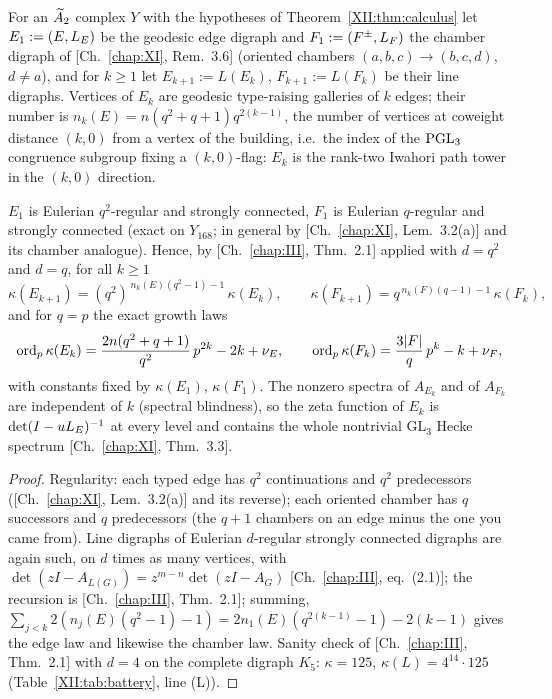 \begin{definition}\label{XII:def:towers}
For an $\widetilde A_2$ complex $Y$ with the hypotheses of Theorem~\ref{XII:thm:calculus} let
$E_1:=(E,L_E)$ be the geodesic edge digraph and $F_1:=(F^{\pm},L_{F})$ the chamber digraph of
[Ch.~\ref{chap:XI}, Rem.~3.6] (oriented chambers $(a,b,c)\to(b,c,d)$, $d\ne a$), and for $k\ge1$ let
$E_{k+1}:=L(E_k)$, $F_{k+1}:=L(F_k)$ be their line digraphs. Vertices of $E_k$ are geodesic
type-raising galleries of $k$ edges; their number is
$n_k(E)=n(q^{2}+q+1)q^{2(k-1)}$, the number of vertices at coweight distance $(k,0)$ from a
vertex of the building, i.e.\ the index of the $\mathrm{PGL}_3$ congruence subgroup fixing a
$(k,0)$-flag: $E_k$ is the rank-two Iwahori path tower in the $(k,0)$ direction.
\end{definition}

\begin{theorem}\label{XII:thm:towers}
$E_1$ is Eulerian $q^{2}$-regular and strongly connected, $F_1$ is Eulerian $q$-regular and
strongly connected (exact on $Y_{168}$; in general by {\rm[Ch.~\ref{chap:XI}, Lem.~3.2(a)]} and its chamber
analogue). Hence, by {\rm[Ch.~\ref{chap:III}, Thm.~2.1]} applied with $d=q^{2}$ and $d=q$, for all $k\ge1$
\[
\kappa(E_{k+1})=(q^{2})^{\,n_k(E)(q^{2}-1)-1}\,\kappa(E_k),\qquad
\kappa(F_{k+1})=q^{\,n_k(F)(q-1)-1}\,\kappa(F_k),
\]
and for $q=p$ the exact growth laws
\[
\operatorname{ord}_p\kappa(E_k)=\frac{2n(q^{2}+q+1)}{q^{2}}\,p^{2k}-2k+\nu_E,\qquad
\operatorname{ord}_p\kappa(F_k)=\frac{3|F|}{q}\,p^{k}-k+\nu_F ,
\]
with constants fixed by $\kappa(E_1)$, $\kappa(F_1)$. The nonzero spectra of $A_{E_k}$ and of
$A_{F_k}$ are independent of $k$ (spectral blindness), so the zeta function of $E_k$ is
$\det(I-uL_E)^{-1}$ at every level and contains the whole nontrivial $\mathrm{GL}_3$ Hecke
spectrum {\rm[Ch.~\ref{chap:XI}, Thm.~3.3]}.
\end{theorem}

\begin{proof}
Regularity: each typed edge has $q^{2}$ continuations and $q^{2}$ predecessors
([Ch.~\ref{chap:XI}, Lem.~3.2(a)] and its reverse); each oriented chamber has $q$ successors and $q$
predecessors (the $q+1$ chambers on an edge minus the one you came from). Line digraphs of
Eulerian $d$-regular strongly connected digraphs are again such, on $d$ times as many
vertices, with $\det(zI-A_{L(G)})=z^{m-n}\det(zI-A_G)$ [Ch.~\ref{chap:III}, eq.~(2.1)]; the recursion is
[Ch.~\ref{chap:III}, Thm.~2.1]; summing, $\sum_{j<k}2(n_j(E)(q^{2}-1)-1)=2n_1(E)(q^{2(k-1)}-1)-2(k-1)$ gives
the edge law and likewise the chamber law. Sanity check of [Ch.~\ref{chap:III}, Thm.~2.1] with $d=4$ on the
complete digraph $K_5$: $\kappa=125$, $\kappa(L)=4^{14}\cdot125$ (Table~\ref{XII:tab:battery},
line (L)).
\end{proof}

